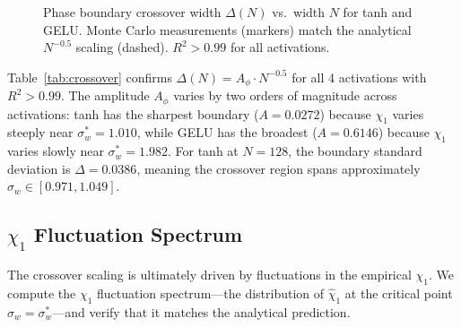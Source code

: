 \documentclass[10pt]{article}
\begin{document}
\begin{figure}[t]
\centering
{}
\caption{Phase boundary crossover width $\Delta(N)$ vs.\ width $N$ for tanh and GELU. Monte Carlo measurements (markers) match the analytical $N^{-0.5}$ scaling (dashed). $R^2 > 0.99$ for all activations.}
\label{fig:crossover}
\end{figure}

Table~\ref{tab:crossover} confirms $\Delta(N) = A_\phi \cdot N^{-0.5}$ for all 4 activations with $R^2 > 0.99$.
The amplitude $A_\phi$ varies by two orders of magnitude across activations: tanh has the sharpest boundary ($A = 0.0272$) because $\chi_1$ varies steeply near $\sigma_w^* = 1.010$, while GELU has the broadest ($A = 0.6146$) because $\chi_1$ varies slowly near $\sigma_w^* = 1.982$.
For tanh at $N = 128$, the boundary standard deviation is $\Delta = 0.0386$, meaning the crossover region spans approximately $\sigma_w \in [0.971, 1.049]$.

\subsection{$\chi_1$ Fluctuation Spectrum}

The crossover scaling is ultimately driven by fluctuations in the empirical $\chi_1$.
We compute the $\chi_1$ fluctuation spectrum---the distribution of $\hat{\chi}_1$ at the critical point $\sigma_w = \sigma_w^*$---and verify that it matches the analytical prediction.
\end{document}
